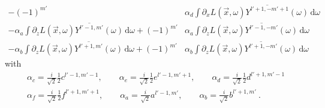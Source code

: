 \documentclass{egpubl}
\newcommand{\ud}{\,\mathrm{d}} %
\begin{document}
\begin{align*}
-\left({-1}\right)^{m'}&\alpha_d\int{\partial_xL\left (\vec{x} ,\omega \right )\overline{Y^{l'+1, -m'+1}}(\omega )\ud\omega}
\\
-\alpha_a\int{\partial_zL\left (\vec{x} ,\omega \right )\overline{Y^{l'-1, m'}}(\omega )\ud\omega}
+\left({-1}\right)^{m'}&\alpha_a\int{\partial_zL\left (\vec{x} ,\omega \right )\overline{Y^{l'-1, -m'}}(\omega )\ud\omega}
\\
-\alpha_b\int{\partial_zL\left (\vec{x} ,\omega \right )\overline{Y^{l'+1, m'}}(\omega )\ud\omega}
+\left({-1}\right)^{m'}&\alpha_b\int{\partial_zL\left (\vec{x} ,\omega \right )\overline{Y^{l'+1, -m'}}(\omega )\ud\omega}
\end{align*}
with
\begin{align*}
\alpha_c = \frac{i}{\sqrt{2}}\frac{1}{2}c^{{l'-1,m'-1}}
,\qquad
\alpha_e = \frac{i}{\sqrt{2}}\frac{1}{2}e^{{l'-1,m'+1}}
,\qquad
\alpha_d = \frac{i}{\sqrt{2}}\frac{1}{2}d^{{l'+1,m'-1}}
\\
\alpha_f = \frac{i}{\sqrt{2}}\frac{1}{2}f^{{l'+1,m'+1}}
,\qquad
\alpha_a = \frac{i}{\sqrt{2}}a^{{l'-1,m'}}
,\qquad
\alpha_b = \frac{i}{\sqrt{2}}b^{{l'+1,m'}} \ .
\end{align*}
\end{document}
